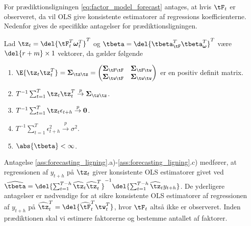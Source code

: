 %
For prædiktionsligningen \eqref{eq:factor_model_forecast} antages, at hvis \(\tF_t\) er observeret, da vil OLS give konsistente estimatorer af regressions koefficienterne.
Nedenfor gives de specifikke antagelser for prædiktionsligningen.
%
\begin{ass}[Prædiktionsligning] \label{ass:forecasting_ligning}
Lad \(\tz_t = \del{\tF_t^T \boldsymbol{\omega}_t^T}^T\) og \(\tbeta = \del{\tbeta_{\tF}^T \tbeta_{\boldsymbol{\omega}}^T}^T\) være \(\del{r+m} \times 1\) vektorer, da gælder følgende
\begin{enumerate}[label=\alph*)]
\item \(\E{\tz_t \tz_t^T} = \boldsymbol{\Sigma}_{\tz \tz} = \begin{pmatrix}
\boldsymbol{\Sigma}_{\tF \tF} & \boldsymbol{\Sigma}_{\tF \tw} \\
\boldsymbol{\Sigma}_{\tw \tF} & \boldsymbol{\Sigma}_{\tw \tw}
\end{pmatrix} \) er en positiv definit matrix.
\item \(T^{-1} \sum_{t=1}^T \tz_t \tz_t^T \overset{p}{\rightarrow} \boldsymbol{\Sigma}_{\tz \tz}\).
\item \(T^{-1} \sum_{t=1}^T \tz_t \epsilon_{t+h} \overset{p}{\rightarrow} \mathbf{0}\).
\item  \(T^{-1} \sum_{t=1}^T \epsilon_{t+h}^2 \overset{p}{\rightarrow} \sigma^2\).
\item \(\abs{\tbeta} < \infty\).
\end{enumerate}
\end{ass}
%
Antagelse \ref{ass:forecasting_ligning}.a)-\ref{ass:forecasting_ligning}.c) medfører, at regressionen af \(y_{t+h}\) på \(\tz_t\) giver konsistente OLS estimatorer givet ved \(\widehat{\tbeta} = \del{\sum_{t=1}^{T-h} \widehat{\tz}_t \widehat{\tz}_t^T}^{-1} \del{\sum_{t=1}^{T-h} \widehat{\tz}_t y_{t+h}}\).
De yderligere antagelser er nødvendige for at sikre konsistente OLS estimatorer af regressionen af \(y_{t+h}\) på \(\widehat{\tz}_t^T =\del{\widehat{\tF}_t^T \tw_t^T}\), hvor \(\tF_t\) altså ikke er observeret.
Inden prædiktionen skal vi estimere faktorerne og bestemme antallet af faktorer.



